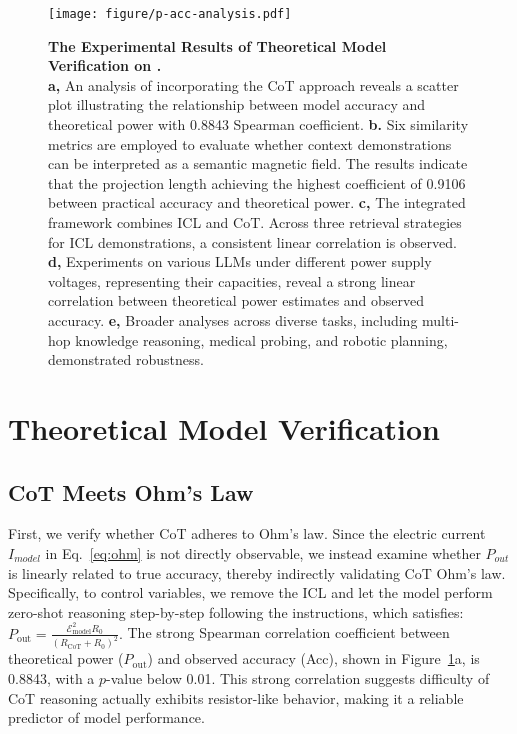 
\begin{figure}[t]
    \centering
    \texttt{[image: figure/p-acc-analysis.pdf]}
    \caption{
        \textbf{The Experimental Results of Theoretical Model Verification on \modelname{}.}\\
        \textbf{a,}
        An analysis of \modelname{} incorporating the CoT approach reveals a scatter plot illustrating the relationship between model accuracy and theoretical power with 0.8843 Spearman coefficient.
        \textbf{b.}
        Six similarity metrics are employed to evaluate whether context demonstrations can be interpreted as a semantic magnetic field. The results indicate that the projection length achieving the highest coefficient of 0.9106 between practical accuracy and theoretical power.
        \textbf{c,}
        The integrated \modelname{} framework combines ICL and CoT. Across three retrieval strategies for ICL demonstrations, a consistent linear correlation is observed.
        \textbf{d,}
        Experiments on various LLMs under different power supply voltages, representing their capacities, reveal a strong linear correlation between theoretical power estimates and observed accuracy.
        \textbf{e,}
        Broader analyses across diverse tasks, including multi-hop knowledge reasoning, medical probing, and robotic planning, demonstrated robustness.\vspace{-8pt}
    }
    \label{fig:verification}
    
\end{figure}

\section{Theoretical Model Verification}

\subsection{CoT Meets Ohm's Law}
First, we verify whether CoT adheres to Ohm's law. Since the electric current $I_{model}$ in Eq.~\ref{eq:ohm} is not directly observable, we instead examine whether $P_{out}$ is linearly related to true accuracy, thereby indirectly validating CoT Ohm's law.
Specifically, to control variables, we remove the ICL and let the model perform zero-shot reasoning step-by-step following the instructions, which satisfies:
$
    P_{\text{out}} = \frac{\mathcal{E}_{\text{model}}^2 R_0}{(R_{\text{CoT}} + R_0)^2}.
$
The strong Spearman correlation coefficient between theoretical power ($P_{\text{out}}$) and observed accuracy (Acc), shown in Figure~\ref{fig:verification}a, is 0.8843, with a $p$-value below 0.01. This strong correlation suggests difficulty of CoT reasoning actually exhibits resistor-like behavior, making it a reliable predictor of model performance.

